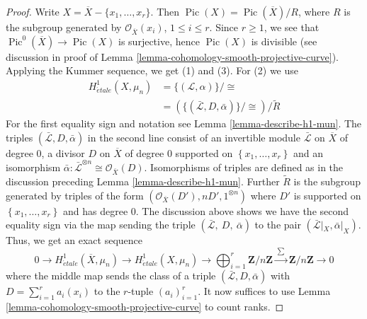 \documentclass[10pt,a4paper]{amsart}
\theoremstyle{plain}
\theoremstyle{definition}
\theoremstyle{remark}
\numberwithin{equation}{subsection}
\def\etale{{\acute{e}tale}}
\def\Pic{\mathop{\mathrm{Pic}}\nolimits}
\begin{document}
\begin{proof}
Write $X = \overline{X} - \{ x_1, \ldots, x_r\}$. Then
$\Pic(X) = \Pic(\overline{X})/ R$, where $R$ is the subgroup generated by
$\mathcal{O}_{\overline{X}}(x_i)$, $1 \leq i \leq r$.
Since $r \geq 1$, we see that $\Pic^0(\overline{X}) \to \Pic(X)$
is surjective, hence $\Pic(X)$ is divisible (see discussion in proof
of Lemma \ref{lemma-cohomology-smooth-projective-curve}).
Applying the Kummer sequence, we get (1) and (3). For (2) we use
\begin{align*}
H_\etale^1(X, \mu_n)
& =
\{(\mathcal L, \alpha)\}/\cong \\
& =
(\{(\bar{\mathcal L}, D, \bar \alpha)\}/\cong)/\tilde{R}
\end{align*}
For the first equality sign and notation see Lemma \ref{lemma-describe-h1-mun}.
The triples $(\bar{\mathcal L}, D, \bar \alpha)$ in the second line
consist of an invertible module $\bar{\mathcal L}$ on $\overline{X}$
of degree $0$, a divisor $D$ on $\overline{X}$ of degree $0$ supported on
$\left\{x_1, \ldots, x_r\right\}$ and an isomorphism
$\bar{\alpha}: \bar{\mathcal L}^{\otimes n} \cong \mathcal{O}_{\bar{X}}(D)$.
Isomorphisms of triples are defined as in the discussion preceding
Lemma \ref{lemma-describe-h1-mun}.
Further $\tilde{R}$ is the subgroup generated by triples of the form
$(\mathcal{O}_{\overline{X}}(D'), n D', 1^{\otimes n})$
where $D'$ is supported on $\left\{x_1, \ldots, x_r\right\}$ and has degree 0.
The discussion above shows we have the second equality sign via
the map sending the triple $(\bar{\mathcal L},\ D,\ \bar \alpha)$
to the pair $(\bar{\mathcal L}|_X, \bar \alpha|_X)$. Thus,
we get an exact sequence
$$
0 \longrightarrow
H_\etale^1(\overline{X}, \mu_n) \longrightarrow
H_\etale^1(X, \mu_n) \longrightarrow
\bigoplus_{i = 1}^r \mathbf{Z}/n\mathbf{Z}
\xrightarrow{\ \sum\ }
\mathbf{Z}/n\mathbf{Z} \longrightarrow 0
$$
where the middle map sends the class of a triple
$(\bar{ \mathcal L}, D, \bar \alpha)$ with $D = \sum_{i = 1}^r a_i (x_i)$
to the $r$-tuple $(a_i)_{i = 1}^r$. It now suffices to use
Lemma \ref{lemma-cohomology-smooth-projective-curve}
to count ranks.
\end{proof}
\end{document}
